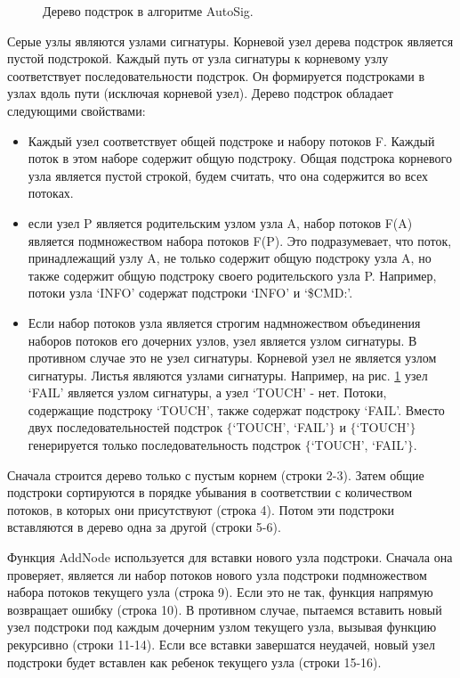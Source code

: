 \begin{figure}[H]
    \begin{center}
        
        \caption{Дерево подстрок в алгоритме AutoSig.}\label{autosig:tree}
    \end{center}
\end{figure}

Серые узлы являются узлами сигнатуры. Корневой узел дерева подстрок является пустой подстрокой.
Каждый путь от узла сигнатуры к корневому узлу соответствует последовательности подстрок.
Он формируется подстроками в узлах вдоль пути (исключая корневой узел).
Дерево подстрок обладает следующими свойствами:

\begin{itemize}
    \item Каждый узел соответствует общей подстроке и набору потоков F.
    Каждый поток в этом наборе содержит общую подстроку.
    Общая подстрока корневого узла является пустой строкой, будем считать, что она содержится во всех потоках.
    \item если узел P является родительским узлом узла A, набор потоков F(A) является подмножеством набора потоков F(P).
    Это подразумевает, что поток, принадлежащий узлу A, не только содержит общую подстроку узла A, но также содержит общую подстроку своего родительского узла P.
    Например, потоки узла `INFO' содержат подстроки `INFO' и `\$CMD:'.
    \item Если набор потоков узла является строгим надмножеством объединения наборов потоков его дочерних узлов, узел является узлом сигнатуры.
    В противном случае это не узел сигнатуры. Корневой узел не является узлом сигнатуры. Листья являются узлами сигнатуры.
    Например, на рис. \ref{autosig:tree} узел `FAIL' является узлом сигнатуры, а узел `TOUCH' - нет.
    Потоки, содержащие подстроку `TOUCH', также содержат подстроку `FAIL'.
    Вместо двух последовательностей подстрок $\{$`TOUCH', `FAIL'$\}$ и $\{$`TOUCH'$\}$
    генерируется только последовательность подстрок $\{$`TOUCH', `FAIL'$\}$.

\end{itemize}

Сначала строится дерево только с пустым корнем (строки 2-3).
Затем общие подстроки сортируются в порядке убывания в соответствии с количеством потоков, в которых они присутствуют (строка 4).
Потом эти подстроки вставляются в дерево одна за другой (строки 5-6).

Функция AddNode используется для вставки нового узла подстроки.
Сначала она проверяет, является ли набор потоков нового узла подстроки подмножеством набора потоков текущего узла (строка 9).
Если это не так, функция напрямую возвращает ошибку (строка 10).
В противном случае, пытаемся вставить новый узел подстроки под каждым дочерним узлом текущего узла, вызывая функцию рекурсивно (строки 11-14).
Если все вставки завершатся неудачей, новый узел подстроки будет вставлен как ребенок текущего узла (строки 15-16).

